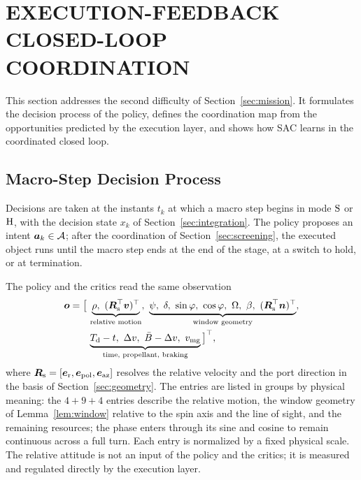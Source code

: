\section{EXECUTION-FEEDBACK CLOSED-LOOP COORDINATION}\label{sec:ecc}

This section addresses the second difficulty of Section~\ref{sec:mission}. It formulates the decision process of the policy, defines the coordination map from the opportunities predicted by the execution layer, and shows how SAC learns in the coordinated closed loop.

\subsection{Macro-Step Decision Process}\label{sec:mdp}

Decisions are taken at the instants $t_{k}$ at which a macro step begins in mode $\mathrm{S}$ or $\mathrm{H}$, with the decision state $x_{k}$ of Section~\ref{sec:integration}. The policy proposes an intent $\boldsymbol{a}_{k}\in\mathcal{A}$; after the coordination of Section~\ref{sec:screening}, the executed object runs until the macro step ends at the end of the stage, at a switch to hold, or at termination.

The policy and the critics read the same observation
\begin{equation}\label{eq:obs}
\begin{aligned}
\bo=\bigl[\,&\underbrace{\rho,\ (\bR_{\mathrm{s}}^{\T}\bv)^{\T}}_{\text{relative motion}},\ \underbrace{\psi,\ \dlat,\ \sin\varphi,\ \cos\varphi,\ \Omega,\ \beta,\ (\bR_{\mathrm{s}}^{\T}\bn)^{\T}}_{\text{window geometry}},\\
&\underbrace{\Td-t,\ \Delta v,\ \Bmax-\Delta v,\ \vmg}_{\text{time, propellant, braking}}\,\bigr]^{\T},
\end{aligned}
\end{equation}
where $\boldsymbol{R}_{\mathrm{s}}=[\boldsymbol{e}_{\mathrm{r}},\boldsymbol{e}_{\mathrm{pol}},\boldsymbol{e}_{\mathrm{az}}]$ resolves the relative velocity and the port direction in the basis of Section~\ref{sec:geometry}. The entries are listed in groups by physical meaning: the $4+9+4$ entries describe the relative motion, the window geometry of Lemma~\ref{lem:window} relative to the spin axis and the line of sight, and the remaining resources; the phase enters through its sine and cosine to remain continuous across a full turn. Each entry is normalized by a fixed physical scale. The relative attitude is not an input of the policy and the critics; it is measured and regulated directly by the execution layer.


